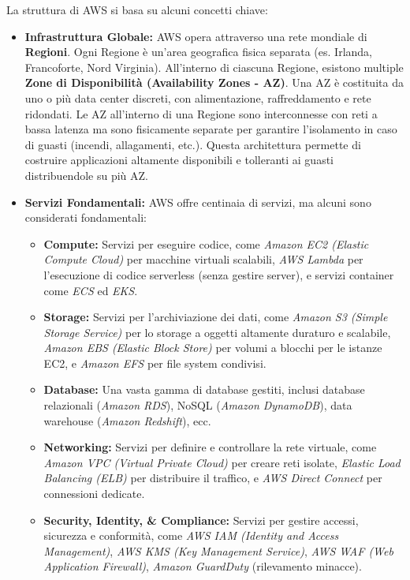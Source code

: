 La struttura di AWS si basa su alcuni concetti chiave:

\begin{itemize}
    \item \textbf{Infrastruttura Globale:} AWS opera attraverso una rete mondiale di \textbf{Regioni}. Ogni Regione è un'area geografica fisica separata (es. Irlanda, Francoforte, Nord Virginia). All'interno di ciascuna Regione, esistono multiple \textbf{Zone di Disponibilità (Availability Zones - AZ)}. Una AZ è costituita da uno o più data center discreti, con alimentazione, raffreddamento e rete ridondati. Le AZ all'interno di una Regione sono interconnesse con reti a bassa latenza ma sono fisicamente separate per garantire l'isolamento in caso di guasti (incendi, allagamenti, etc.). Questa architettura permette di costruire applicazioni altamente disponibili e tolleranti ai guasti distribuendole su più AZ.
    \item \textbf{Servizi Fondamentali:} AWS offre centinaia di servizi, ma alcuni sono considerati fondamentali:
        \begin{itemize}
            \item \textbf{Compute:} Servizi per eseguire codice, come \textit{Amazon EC2 (Elastic Compute Cloud)} per macchine virtuali scalabili, \textit{AWS Lambda} per l'esecuzione di codice serverless (senza gestire server), e servizi container come \textit{ECS} ed \textit{EKS}.
            \item \textbf{Storage:} Servizi per l'archiviazione dei dati, come \textit{Amazon S3 (Simple Storage Service)} per lo storage a oggetti altamente duraturo e scalabile, \textit{Amazon EBS (Elastic Block Store)} per volumi a blocchi per le istanze EC2, e \textit{Amazon EFS} per file system condivisi.
            \item \textbf{Database:} Una vasta gamma di database gestiti, inclusi database relazionali (\textit{Amazon RDS}), NoSQL (\textit{Amazon DynamoDB}), data warehouse (\textit{Amazon Redshift}), ecc.
            \item \textbf{Networking:} Servizi per definire e controllare la rete virtuale, come \textit{Amazon VPC (Virtual Private Cloud)} per creare reti isolate, \textit{Elastic Load Balancing (ELB)} per distribuire il traffico, e \textit{AWS Direct Connect} per connessioni dedicate.
            \item \textbf{Security, Identity, \& Compliance:} Servizi per gestire accessi, sicurezza e conformità, come \textit{AWS IAM (Identity and Access Management)}, \textit{AWS KMS (Key Management Service)}, \textit{AWS WAF (Web Application Firewall)}, \textit{Amazon GuardDuty} (rilevamento minacce).

\end{itemize}
\end{itemize}
